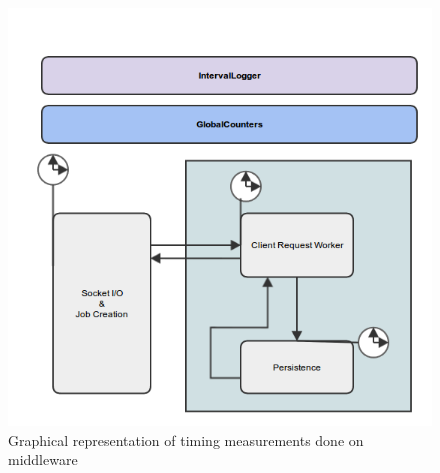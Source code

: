 \documentclass{article}
\begin{document}
            \begin{figure}[H]
                \centering
                \includegraphics[scale=0.50]{timing_measurements}
                \caption{Graphical representation of timing measurements done on middleware}
                \label{fig:timing_measurements}
            \end{figure}
\end{document}

